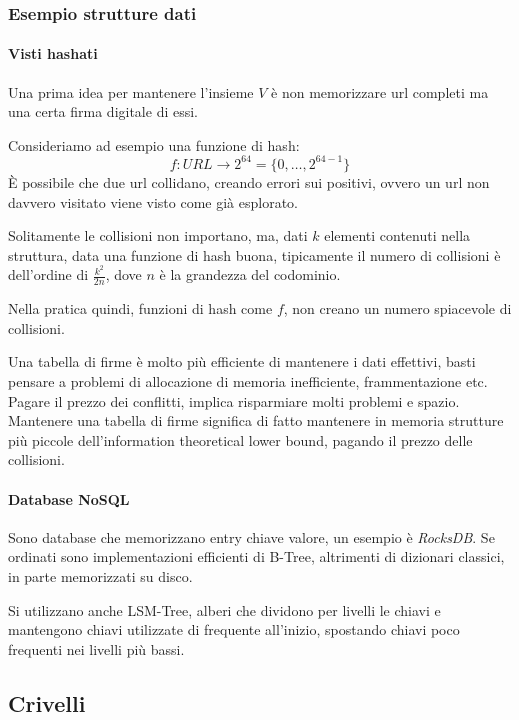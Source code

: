 \subsubsection{Esempio strutture dati}

\paragraph{Visti hashati}
Una prima idea per mantenere l'insieme $V$ è non memorizzare url completi ma una certa firma digitale 
di essi. 

Consideriamo ad esempio una funzione di hash:
$$f : \mathit{URL} \longrightarrow 2^{64} = \{0, \dots, 2^{64-1}\}$$
È possibile che due url collidano, creando errori sui positivi, ovvero un 
url non davvero visitato viene visto come già esplorato.

Solitamente le collisioni non importano, ma, dati $k$ elementi contenuti 
nella struttura, data una funzione di hash buona, tipicamente il numero di collisioni 
è dell'ordine di $\frac{k^2}{2n}$, dove $n$ è la grandezza del codominio. 

Nella pratica quindi, funzioni di hash come $f$, non creano un numero 
spiacevole di collisioni.
\begin{remark}
    Una tabella di firme è molto più efficiente di mantenere i dati effettivi, 
    basti pensare a problemi di allocazione di memoria inefficiente, frammentazione 
    etc.
    Pagare il prezzo dei conflitti, implica risparmiare molti problemi e spazio.\\
    Mantenere una tabella di firme significa di fatto mantenere in memoria strutture 
    più piccole dell'information theoretical lower bound, pagando il prezzo delle collisioni.
\end{remark}

\paragraph{Database NoSQL}
Sono  database che memorizzano entry chiave valore, 
un esempio è \emph{RocksDB}. Se ordinati sono implementazioni efficienti di B-Tree, 
altrimenti di dizionari classici, in parte memorizzati su disco. 

Si utilizzano anche LSM-Tree, alberi che dividono per livelli le chiavi e mantengono 
chiavi utilizzate di frequente all'inizio, spostando chiavi poco frequenti nei 
livelli più bassi.

\subsection{Crivelli}

